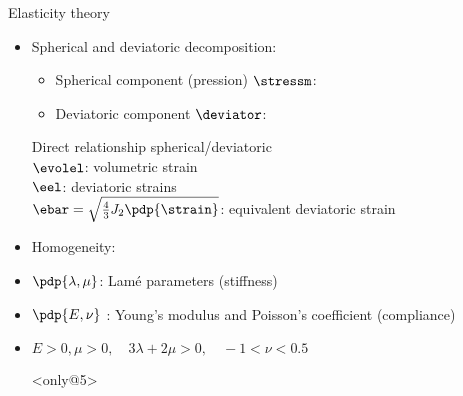 \begin{frame}{Elasticity theory}
{\begin{itemize}
		\item<only@4>Spherical and deviatoric decomposition:
		\begin{itemize}
				\item Spherical component (pression) $\stressm$: 
				\item Deviatoric component $\deviator$:
		\end{itemize}
Direct relationship spherical/deviatoric\\
		$\evolel$: volumetric strain\\
			$\eel$: deviatoric strains	\\
			$\ebar=\sqrt{\frac{4}{3}J_2\pdp{\strain}}$: equivalent deviatoric strain
		\item<only@5> Homogeneity:
		\item<only@5>  $\pdp{\lambda,\mu}$: Lam\'e parameters (stiffness)
		\item<only@5>  $\pdp{E,\nu}$ : Young's modulus and Poisson's coefficient (compliance)
		\item<only@5>  $E>0, \mu>0,\quad 3\lambda+2\mu>0,\quad -1<\nu<0.5$
		\item[]<only@5> 
	\end{itemize}
}
\end{frame}
%
